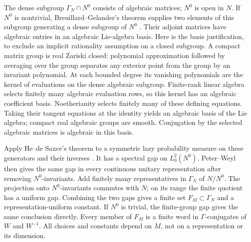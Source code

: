 The dense subgroup $\Gamma_N\cap N^0$ consists of algebraic
matrices; $N^0$ is open in $N$.
If $N^0$ is nontrivial, Breuillard--Gelander's theorem supplies
two elements of this subgroup generating a dense subgroup of
$N^0$ \cite[Theorem~1.1]{BreuillardGelander2003}.
Their adjoint matrices have algebraic entries in an algebraic
Lie-algebra basis. Here is the basis justification, to exclude
an implicit rationality assumption on a closed subgroup.
A compact matrix group is real Zariski closed: polynomial
approximation followed by averaging over the group separates
any exterior point from the group by an invariant polynomial.
At each bounded degree its vanishing polynomials are the kernel
of evaluations on the dense algebraic subgroup. Finite-rank
linear algebra selects finitely many algebraic evaluation rows,
so this kernel has an algebraic coefficient basis.
Noetherianity selects finitely many of these defining equations.
Taking their tangent equations at the identity yields an
algebraic basis of the Lie algebra; compact real algebraic groups
are smooth. Conjugation by the selected algebraic matrices is
algebraic in this basis.

Apply He--de Saxce's theorem to a symmetric lazy probability
measure on these generators and their inverses
\cite[Theorem~1.4]{HeDeSaxce2021}. It has a spectral gap on
$L^2_0(N^0)$. Peter--Weyl then gives the same gap in every
continuous unitary representation after removing $N^0$-invariants.
Add finitely many representatives in $\Gamma_N$ of $N/N^0$.
The projection onto $N^0$-invariants commutes with $N$; on its
range the finite quotient has a uniform gap.
Combining the two gaps gives a finite set $F_M\subset\Gamma_N$
and a representation-uniform constant. If $N^0$ is trivial,
the finite-group gap gives the same conclusion directly.
Every member of $F_M$ is a finite word in $\Gamma$-conjugates of
$W$ and $W^{-1}$. All choices and constants depend on $M$,
not on a representation or its dimension.


